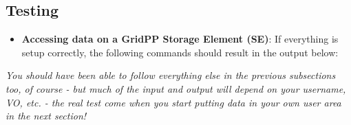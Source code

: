 \subsection{Testing}
\label{putting-data-on-the-grid---testing}

\begin{itemize}
\tightlist
\item
  \textbf{Accessing data on a GridPP Storage Element (SE)}: If
  everything is setup correctly, the following commands should result in
  the output below:
\end{itemize}

\begin{Shaded}
\begin{Highlighting}[]
\NormalTok{$ } \NormalTok{~}
\NormalTok{$ } 
\NormalTok{$ } 
\NormalTok{$ } 
\NormalTok{\{}\NormalTok{: }\DataTypeTok{\{\}}\NormalTok{,}
 \NormalTok{: \{}\NormalTok{: }\NormalTok{\}\}}
\NormalTok{$ } 

 
\end{Highlighting}
\end{Shaded}

\emph{You should have been able to follow everything else in the
previous subsections too, of course - but much of the input and output
will depend on your username, VO, etc. - the real test come when you
start putting data in your own user area in the next section!}
